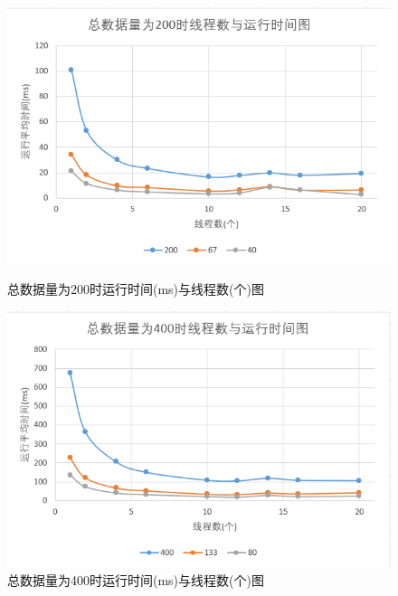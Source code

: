 \documentclass[UTF8]{ctexart}
\begin{document}
\begin{figure}[H]
    \centering
    \begin{minipage}[t]{0.45\linewidth}
    \centering
    \includegraphics[scale=0.33]{200.png}
    \caption{总数据量为200时运行时间(ms)与线程数(个)图}
    \end{minipage}%
    \begin{minipage}[t]{0.45\linewidth}
    \centering
    \includegraphics[scale=0.33]{400.png}
    \caption{总数据量为400时运行时间(ms)与线程数(个)图}
    \end{minipage}
\end{figure}
\end{document}
